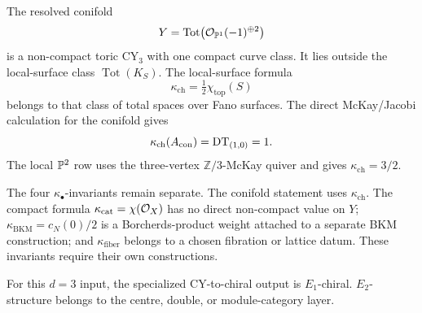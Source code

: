 The resolved conifold
\[
  Y=\operatorname{Tot}\bigl(\mathcal O_{\mathbb P^1}(-1)^{\oplus 2}\bigr)
\]
is a non-compact toric CY$_3$ with one compact curve class.  It lies
outside the local-surface class \(\operatorname{Tot}(K_S)\).  The
local-surface formula
\[
  \kappa_{\mathrm{ch}}=\tfrac{1}{2}\chi_{\mathrm{top}}(S)
\]
belongs to that class of total spaces over Fano surfaces.  The direct
McKay/Jacobi calculation for the conifold gives
\[
  \kappa_{\mathrm{ch}}(A_{\mathrm{con}})=\mathrm{DT}_{(1,0)}=1 .
\]
The local \(\mathbb P^2\) row uses the three-vertex
\(\mathbb Z/3\)-McKay quiver and gives
\(\kappa_{\mathrm{ch}}=3/2\).

The four \(\kappa_\bullet\)-invariants remain separate.  The conifold
statement uses \(\kappa_{\mathrm{ch}}\).  The compact formula
\(\kappa_{\mathrm{cat}}=\chi(\mathcal O_X)\) has no direct non-compact value on
\(Y\); \(\kappa_{\mathrm{BKM}}=c_N(0)/2\) is a Borcherds-product
weight attached to a separate BKM construction; and
\(\kappa_{\mathrm{fiber}}\) belongs to a chosen fibration or lattice
datum.  These invariants require their own constructions.

For this \(d=3\) input, the specialized CY-to-chiral output is
\(E_1\)-chiral.  \(E_2\)-structure belongs to the centre, double, or
module-category layer.
